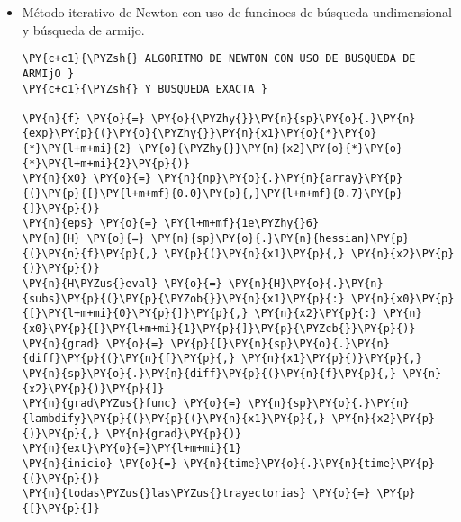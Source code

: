 \begin{itemize}
\begin{tcolorbox}[breakable, size=fbox, boxrule=1pt, pad at break*=1mm,colback=cellbackground, colframe=cellborder]
\begin{Verbatim}[commandchars=\\\{\}]
\PY{c+c1}{\PYZsh{}    print(f\PYZsq{}\PYZob{}ext\PYZcb{}  \PYZam{} \PYZob{}total\PYZus{}armijo\PYZcb{} \PYZam{}  (\PYZob{}xa[0]:.4\PYZcb{} , \PYZob{}xa[1]:.4\PYZcb{}) \PYZam{}( \PYZob{}x0[0]:.4f\PYZcb{},\PYZob{}x0[1]:.4f\PYZcb{} ) \PYZam{} \PYZob{}norm\PYZus{}grad:8f\PYZcb{} \PYZam{} \PYZob{}f.subs(\PYZob{}x1:x0[0],x2:x0[1]\PYZcb{}):.8f\PYZcb{} \PYZam{} \PYZob{}(fin\PYZhy{}inicio):.4f\PYZcb{} \PYZbs{}\PYZbs{}\PYZbs{}\PYZbs{}\PYZsq{})}
\PY{n}{graficoPuntos}\PY{p}{(}\PY{n}{todas\PYZus{}las\PYZus{}trayectorias}\PY{p}{)}
\end{Verbatim}
\end{tcolorbox}



\item Método iterativo de Newton con uso de funcinoes de búsqueda undimensional y búsqueda de armijo.

    \begin{tcolorbox}[breakable, size=fbox, boxrule=1pt, pad at break*=1mm,colback=cellbackground, colframe=cellborder]
\begin{Verbatim}[commandchars=\\\{\}]
\PY{c+c1}{\PYZsh{} ALGORITMO DE NEWTON CON USO DE BUSQUEDA DE ARMIjO }
\PY{c+c1}{\PYZsh{} Y BUSQUEDA EXACTA }

\PY{n}{f} \PY{o}{=} \PY{o}{\PYZhy{}}\PY{n}{sp}\PY{o}{.}\PY{n}{exp}\PY{p}{(}\PY{o}{\PYZhy{}}\PY{n}{x1}\PY{o}{*}\PY{o}{*}\PY{l+m+mi}{2} \PY{o}{\PYZhy{}}\PY{n}{x2}\PY{o}{*}\PY{o}{*}\PY{l+m+mi}{2}\PY{p}{)}
\PY{n}{x0} \PY{o}{=} \PY{n}{np}\PY{o}{.}\PY{n}{array}\PY{p}{(}\PY{p}{[}\PY{l+m+mf}{0.0}\PY{p}{,}\PY{l+m+mf}{0.7}\PY{p}{]}\PY{p}{)}
\PY{n}{eps} \PY{o}{=} \PY{l+m+mf}{1e\PYZhy{}6}
\PY{n}{H} \PY{o}{=} \PY{n}{sp}\PY{o}{.}\PY{n}{hessian}\PY{p}{(}\PY{n}{f}\PY{p}{,} \PY{p}{(}\PY{n}{x1}\PY{p}{,} \PY{n}{x2}\PY{p}{)}\PY{p}{)}
\PY{n}{H\PYZus{}eval} \PY{o}{=} \PY{n}{H}\PY{o}{.}\PY{n}{subs}\PY{p}{(}\PY{p}{\PYZob{}}\PY{n}{x1}\PY{p}{:} \PY{n}{x0}\PY{p}{[}\PY{l+m+mi}{0}\PY{p}{]}\PY{p}{,} \PY{n}{x2}\PY{p}{:} \PY{n}{x0}\PY{p}{[}\PY{l+m+mi}{1}\PY{p}{]}\PY{p}{\PYZcb{}}\PY{p}{)}
\PY{n}{grad} \PY{o}{=} \PY{p}{[}\PY{n}{sp}\PY{o}{.}\PY{n}{diff}\PY{p}{(}\PY{n}{f}\PY{p}{,} \PY{n}{x1}\PY{p}{)}\PY{p}{,} \PY{n}{sp}\PY{o}{.}\PY{n}{diff}\PY{p}{(}\PY{n}{f}\PY{p}{,} \PY{n}{x2}\PY{p}{)}\PY{p}{]}
\PY{n}{grad\PYZus{}func} \PY{o}{=} \PY{n}{sp}\PY{o}{.}\PY{n}{lambdify}\PY{p}{(}\PY{p}{(}\PY{n}{x1}\PY{p}{,} \PY{n}{x2}\PY{p}{)}\PY{p}{,} \PY{n}{grad}\PY{p}{)}
\PY{n}{ext}\PY{o}{=}\PY{l+m+mi}{1}
\PY{n}{inicio} \PY{o}{=} \PY{n}{time}\PY{o}{.}\PY{n}{time}\PY{p}{(}\PY{p}{)}
\PY{n}{todas\PYZus{}las\PYZus{}trayectorias} \PY{o}{=} \PY{p}{[}\PY{p}{]}


\end{Verbatim}
\end{tcolorbox}
\end{itemize}
